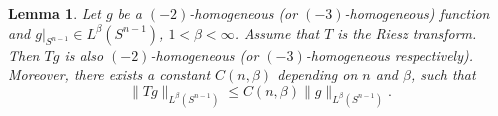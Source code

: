 \documentclass[12pt]{amsart}
\newtheorem{lemma}[theorem]{Lemma}
\newcommand{\Bu}{{\boldsymbol{u}}}
\begin{document}
	
	\begin{lemma}\label{Riesz}
		Let $g$ be a $(-2)$-homogeneous (or $(-3)$-homogeneous) function and $g|_{S^{n-1}} \in L^\beta (S^{n-1})$, $1<\beta< \infty$. Assume that $T$ is the Riesz transform. Then $Tg$ is also $(-2)$-homogeneous (or $(-3)$-homogeneous respectively). Moreover, there exists a constant $C(n, \beta)$ depending on $n$ and $\beta$, such that 
		\begin{equation}\label{eq:SIOesti}
			\|Tg\|_{L^\beta(S^{n-1})} \leq C (n, \beta ) \|g\|_{L^\beta(S^{n-1})}. 
		\end{equation}
	\end{lemma}
	
	
	
	
	
\end{document}
